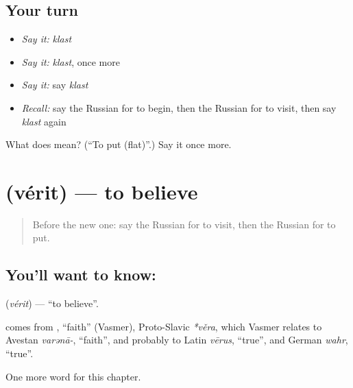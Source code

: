 \subsection*{Your turn}
\begin{itemize}
\raggedright
  \item \emph{Say it:} \emph{klast}
  \item \emph{Say it:} \emph{klast}, once more
  \item \emph{Say it:} say \emph{klast}
  \item \emph{Recall:} say the Russian for to begin, then the Russian for to visit, then say \emph{klast} again
\end{itemize}

\begin{tcolorbox}[breakable,colback=teal!4,colframe=teal!35!black,title={Before you move on}]
What does  mean? (\textquotedblleft{}To put (flat)\textquotedblright{}.) Say it once more.
\end{tcolorbox}
\section[\texorpdfstring{\ru{верить} (vérit)}{верить (vérit)}]{ (vérit) — to believe}

\label{lesson:RU-C131-to-believe}



\begin{quote}
Before the new one: say the Russian for to visit, then the Russian for to put.
\end{quote}

\subsection*{You'll want to know: }
\textbf{} (\emph{vérit}) — \textquotedblleft{}to believe\textquotedblright{}.

\begin{cousinweb}
\textbf{} comes from \emph{}, \textquotedblleft{}faith\textquotedblright{} (Vasmer), Proto-Slavic \emph{*věra}, which Vasmer relates to Avestan \emph{varənā-}, \textquotedblleft{}faith\textquotedblright{}, and probably to Latin \emph{vērus}, \textquotedblleft{}true\textquotedblright{}, and German \emph{wahr}, \textquotedblleft{}true\textquotedblright{}.
\end{cousinweb}

\begin{grammarlens}[title={What you've built}]
One more word for this chapter.
\end{grammarlens}

